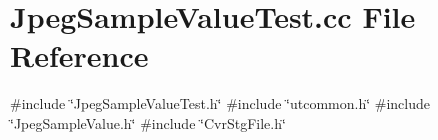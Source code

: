 \section{Jpeg\+Sample\+Value\+Test.\+cc File Reference}
\label{JpegSampleValueTest_8cc}
{\ttfamily \#include \char`\"{}Jpeg\+Sample\+Value\+Test.\+h\char`\"{}}\newline
{\ttfamily \#include \char`\"{}utcommon.\+h\char`\"{}}\newline
{\ttfamily \#include \char`\"{}Jpeg\+Sample\+Value.\+h\char`\"{}}\newline
{\ttfamily \#include \char`\"{}Cvr\+Stg\+File.\+h\char`\"{}}\newline
